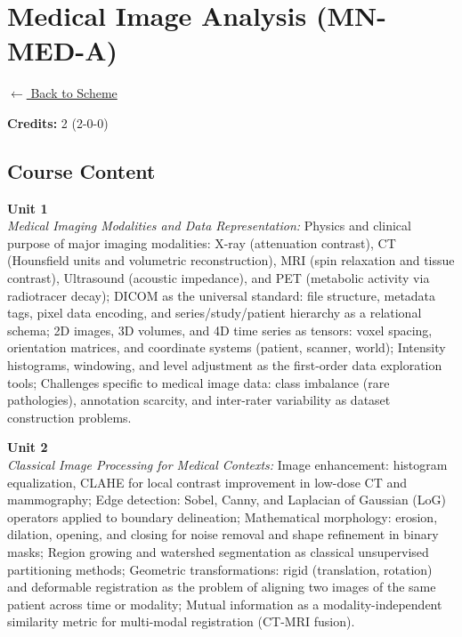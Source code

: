 \section*{Medical Image Analysis (MN-MED-A)}
\label{minor:MED_L2}

\noindent \small{\hyperref[main:scheme]{$\leftarrow$ Back to Scheme}} \vspace{0.5cm}

\noindent \textbf{Credits:} 2 (2-0-0)

\subsection*{Course Content}
\noindent\textbf{Unit 1} \\
\textit{Medical Imaging Modalities and Data Representation:} Physics and clinical purpose of major imaging modalities: X-ray (attenuation contrast), CT (Hounsfield units and volumetric reconstruction), MRI (spin relaxation and tissue contrast), Ultrasound (acoustic impedance), and PET (metabolic activity via radiotracer decay); DICOM as the universal standard: file structure, metadata tags, pixel data encoding, and series/study/patient hierarchy as a relational schema; 2D images, 3D volumes, and 4D time series as tensors: voxel spacing, orientation matrices, and coordinate systems (patient, scanner, world); Intensity histograms, windowing, and level adjustment as the first-order data exploration tools; Challenges specific to medical image data: class imbalance (rare pathologies), annotation scarcity, and inter-rater variability as dataset construction problems.

\vspace{0.3cm}

\noindent\textbf{Unit 2} \\
\textit{Classical Image Processing for Medical Contexts:} Image enhancement: histogram equalization, CLAHE for local contrast improvement in low-dose CT and mammography; Edge detection: Sobel, Canny, and Laplacian of Gaussian (LoG) operators applied to boundary delineation; Mathematical morphology: erosion, dilation, opening, and closing for noise removal and shape refinement in binary masks; Region growing and watershed segmentation as classical unsupervised partitioning methods; Geometric transformations: rigid (translation, rotation) and deformable registration as the problem of aligning two images of the same patient across time or modality; Mutual information as a modality-independent similarity metric for multi-modal registration (CT-MRI fusion).


